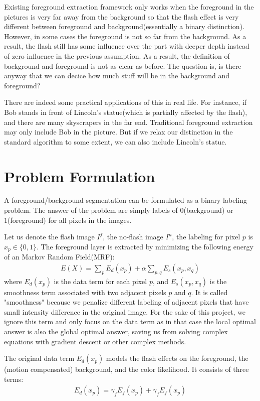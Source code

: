 \documentclass[final]{cvpr}
\begin{document}
Existing foreground extraction framework only works when the foreground in
the pictures is very far away from the background so that the flash effect is very
different between foreground and background(essentially a binary distinction).
However, in some cases the foreground is not so far from the background. As a
result, the flash still has some influence over the part with deeper depth instead
of zero influence in the previous assumption. As a result, the definition of
background and foreground is not as clear as before. The question is, is there 
anyway that we can decice how much stuff will be in the background and foreground?

There are indeed some practical applications of this in real life. For instance, if Bob
stands in front of Lincoln’s statue(which is partially affected by the flash), and
there are many skyscrapers in the far end. Traditional foreground extraction
may only include Bob in the picture. But if we relax our distinction in the standard
algorithm to some extent, we can also include Lincoln’s statue. 

\section{Problem Formulation}
A foreground/background segmentation can be formulated as a binary labeling problem.
The answer of the problem are simply labels of 0(background) or 1(foreground) for all 
pixels in the images. 

Let us denote the flash image $I^f$, the no-flash image $I^n$, the labeling for pixel $p$
is $x_p \in \{0,1\}$. The foreground layer is extracted by minimizing the following energy of 
an Markov Random Field(MRF):
\begin{align}
   E(X) = \sum_{p} E_d(x_p) + \alpha \sum_{p,q}E_s(x_p,x_q)
\end{align}
where $E_d(x_p)$ is the data term for each pixel $p$, and $E_s(x_p,x_q)$ is the 
smoothness term associated with two adjacent pixels $p$ and $q$. It is called 
"smoothness" because we penalize different labeling of adjacent pixels that 
have small intensity difference in the original image. For the sake of this project,
we ignore this term and only focus on the data term as in that case the local optimal 
answer is also the global optimal answer, saving us from solving complex equations with 
gradient descent or other complex methods.

The original data term $E_d(x_p)$ models the flash effects on the
foreground, the (motion compensated) background, and the
color likelihood. It consists of three terms:
\begin{align}
   E_d(x_p) = \gamma_fE_f(x_p) + \gamma_fE_f(x_p)
\end{align}
\end{document}
